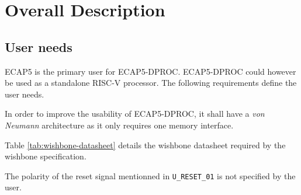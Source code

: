 \section{Overall Description}

\subsection{User needs}

\label{user-needs}

\begin{content}
ECAP5 is the primary user for ECAP5-DPROC. ECAP5-DPROC could however be used as a standalone RISC-V processor. The following requirements define the user needs. 
\end{content}


\begin{content}
  In order to improve the usability of ECAP5-DPROC, it shall have a \textit{von Neumann} architecture as it only requires one memory interface.
\end{content}




\begin{content}
  Table \ref{tab:wishbone-datasheet} details the wishbone datasheet required by the wishbone specification.
\end{content}



\vspace{0.5em}


\begin{content}
The polarity of the reset signal mentionned in \texttt{U\_RESET\_01} is not specified by the user.
\end{content}

